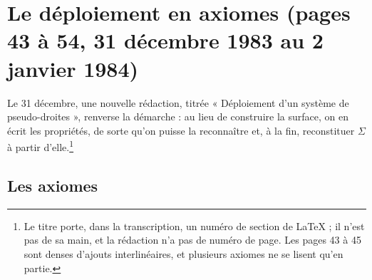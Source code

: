 \documentclass[11pt,a4paper]{article}
\begin{document}
\section*{Le déploiement en axiomes (pages 43 à 54, 31 décembre 1983 au 2 janvier 1984)}

Le 31 décembre, une nouvelle rédaction, titrée « Déploiement d'un système de
pseudo-droites », renverse la démarche : au lieu de construire la surface, on
en écrit les propriétés, de sorte qu'on puisse la reconnaître et, à la fin,
reconstituer $\Sigma$ à partir d'elle.\footnote{Le titre porte, dans la
transcription, un numéro de section de LaTeX ; il n'est pas de sa main, et la
rédaction n'a pas de numéro de page. Les pages 43 à 45 sont denses d'ajouts
interlinéaires, et plusieurs axiomes ne se lisent qu'en partie.}

\subsection*{Les axiomes}
\end{document}
